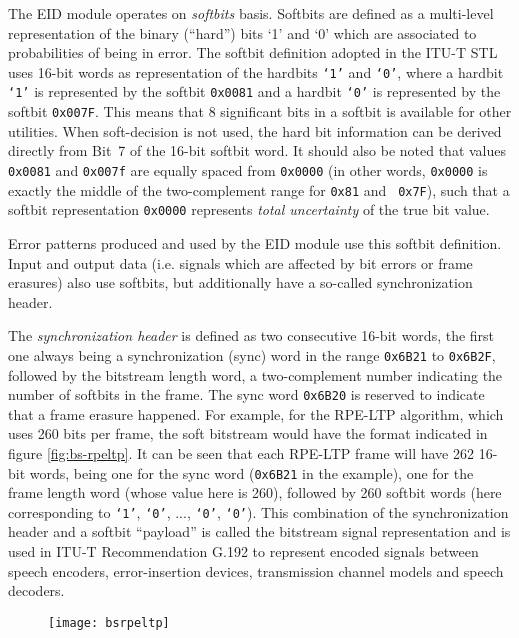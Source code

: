 The EID module operates on {\em softbits} basis. Softbits are defined
as a multi-level representation of the binary (``hard'') bits `1' and
`0' which are associated to probabilities of being in error. The
softbit definition adopted in the ITU-T STL uses 16-bit words as
representation of the hardbits {\tt `1'} and {\tt `0'}, where a
hardbit {\tt `1'} is represented by the softbit {\tt 0x0081} and a
hardbit {\tt `0'} is represented by the softbit {\tt 0x007F}. This
means that 8 significant bits in a softbit is available for other
utilities. When soft-decision is not used, the hard bit information
can be derived directly from Bit~7 of the 16-bit softbit word. It
should also be noted that values {\tt 0x0081} and {\tt 0x007f} are
equally spaced from {\tt 0x0000} (in other words, {\tt 0x0000} is
exactly the middle of the two-complement range for {\tt 0x81} and {\tt
  0x7F}), such that a softbit representation {\tt 0x0000} represents
{\em total uncertainty} of the true bit value.

Error patterns produced and used by the EID module use this softbit
definition. Input and output data (i.e. signals which are affected by
bit errors or frame erasures) also use softbits, but additionally have
a so-called synchronization header.

The {\em synchronization header} is defined as two consecutive 16-bit
words, the first one always being a synchronization (sync) word in the
range {\tt 0x6B21} to {\tt 0x6B2F}, followed by the bitstream length
word, a two-complement number indicating the number of softbits in the
frame. The sync word {\tt 0x6B20} is reserved to indicate that a frame
erasure happened. For example, for the RPE-LTP algorithm, which uses
260 bits per frame, the soft bitstream would have the format indicated
in figure \ref{fig:bs-rpeltp}. It can be seen that each RPE-LTP frame
will have 262 16-bit words, being one for the sync word ({\tt 0x6B21}
in the example), one for the frame length word (whose value here is
260), followed by 260 softbit words (here corresponding to {\tt `1'},
{\tt `0'}, ..., {\tt `0'}, {\tt`0'}). This combination of the
synchronization header and a softbit ``payload'' is called the
bitstream signal representation and is used in ITU-T Recommendation
G.192 \cite{G.192} to represent encoded signals between speech
encoders, error-insertion devices, transmission channel models and
speech decoders.

\begin{figure}[ht]
\begin{center}
    \texttt{[image: bsrpeltp]}
\end{center}
\end{figure}

